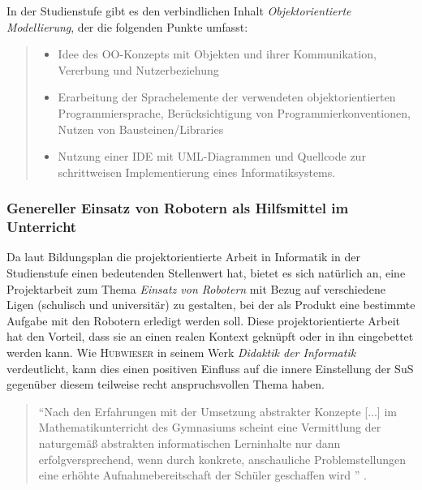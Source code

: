 \documentclass[paper=a4, DIV=calc, BCOR=15mm, twoside=on, onecolumn=on, open = right, titlepage =on, parskip =half, headsepline = on, footsepline = on, chapterprefix = off, appendixprefix = off, fontsize = 12pt, numbers = noenddot, abstract = on]{scrbook}
\begin{document}
In der Studienstufe gibt es den verbindlichen Inhalt \emph{Objektorientierte Modellierung}, der die folgenden Punkte umfasst:\\
\begin{quote}
\begin{itemize}
\item Idee des OO-Konzepts mit Objekten und ihrer Kommunikation, Vererbung und Nutzerbeziehung
\item Erarbeitung der Sprachelemente der verwendeten objektorientierten Programmiersprache, Berücksichtigung von Programmierkonventionen, Nutzen von Bausteinen/Libraries
\item Nutzung einer IDE mit UML-Diagrammen und Quellcode zur schrittweisen Implementierung eines Informatiksystems. \qquad \cite{oberstufe:09}
\end{itemize}
\end{quote}


\subsubsection{Genereller Einsatz von Robotern als Hilfsmittel im Unterricht}
Da laut Bildungsplan die projektorientierte Arbeit in Informatik in der Studienstufe einen bedeutenden Stellenwert hat, bietet es sich natürlich an, eine Projektarbeit zum Thema \emph{Einsatz von Robotern} mit Bezug auf verschiedene Ligen (schulisch und universitär) zu gestalten, bei der als Produkt eine bestimmte Aufgabe mit den Robotern erledigt werden soll.  Diese projektorientierte Arbeit hat den Vorteil, dass sie an einen realen Kontext geknüpft oder in ihn eingebettet werden kann. Wie \textsc{Hubwieser} in seinem Werk \emph{Didaktik der Informatik} verdeutlicht, kann dies einen positiven Einfluss auf die innere Einstellung der SuS gegenüber diesem teilweise recht anspruchsvollen Thema haben.
\begin{quote}
"`Nach den Erfahrungen mit der Umsetzung abstrakter Konzepte [...] im Mathematikunterricht des Gymnasiums scheint eine Vermittlung der naturgemäß abstrakten informatischen Lerninhalte nur dann erfolgversprechend, wenn durch konkrete, anschauliche Problemstellungen eine erhöhte Aufnahmebereitschaft der Schüler geschaffen wird "' \cite[S.68]{hubwieser:07}.
\end{quote}
\end{document}
